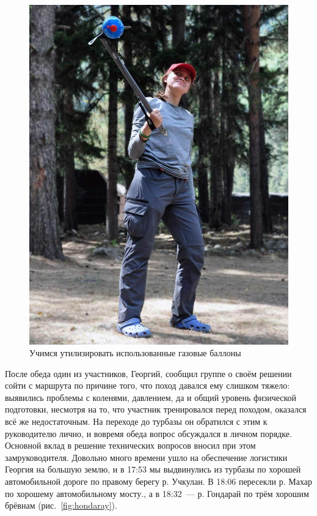 \begin{figure}[h!]
\begin{minipage}[h]{0.30\linewidth}
		\includegraphics[width=\linewidth]{../pics/DSC_1152.jpg}
	\end{minipage}
	\caption{Учимся утилизировать использованные газовые баллоны \smiley}
	\label{fig:DSC_1150}
\end{figure}

После обеда один из участников, Георгий, сообщил группе о своём решении сойти с маршрута по причине того, что поход давался ему слишком тяжело: выявились проблемы с коленями, давлением, да и общий уровень физической подготовки, несмотря на то, что участник тренировался перед походом, оказался всё же недостаточным. На переходе до турбазы он обратился с этим к руководителю лично, и вовремя обеда вопрос обсуждался в личном порядке. Основной вклад в решение технических вопросов вносил при этом замруководителя. Довольно много времени ушло на обеспечение логистики Георгия на большую землю, и в 17:53 мы выдвинулись из турбазы по хорошей автомобильной дороге по правому берегу р. Учкулан. В 18:06 пересекли р. Махар по хорошему автомобильному мосту., а в 18:32~--- р. Гондарай по трём хорошим брёвнам (рис.~\ref{fig:hondaray}).

